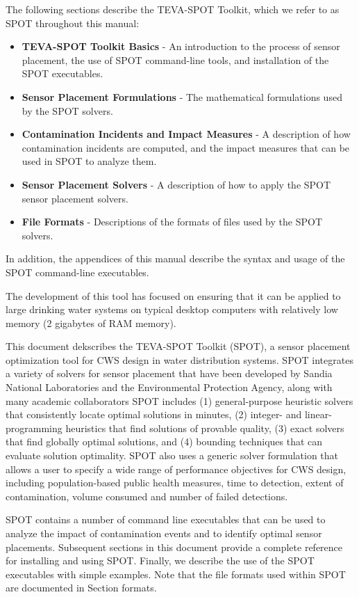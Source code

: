 The following sections describe the TEVA-\/SPOT Toolkit, which we refer to as SPOT throughout this manual: 
\begin{itemize}
\item {\bfseries TEVA-\/SPOT Toolkit Basics} -\/ An introduction to the process of sensor placement, the use of SPOT command-\/line tools, and installation of the SPOT executables. 
\item {\bfseries Sensor Placement Formulations} -\/ The mathematical formulations used by the SPOT solvers. 
\item {\bfseries Contamination Incidents and Impact Measures} -\/ A description of how contamination incidents are computed, and the impact measures that can be used in SPOT to analyze them.


\item {\bfseries Sensor Placement Solvers} -\/ A description of how to apply the SPOT sensor placement solvers. 
\item {\bfseries File Formats} -\/ Descriptions of the formats of files used by the SPOT solvers. 
\end{itemize}In addition, the appendices of this manual describe the syntax and usage of the SPOT command-\/line executables.

 

The development of this tool has focused on
ensuring that it can be applied to large drinking water systems on typical
desktop computers with relatively low memory (2 gigabytes of RAM memory).


This document dekscribes the TEVA-SPOT Toolkit (SPOT), a sensor placement
optimization tool for CWS design in water distribution systems. SPOT
integrates a variety of solvers for sensor placement that have been
developed by Sandia National Laboratories and the Environmental
Protection Agency, along with many academic collaborators\latexonly
\cite{MurUbeJan06,MurBerHar06,CarGreHarKonLauLinMorPhi06,HarBerMurPhiRieWat07,BerHarPhiUbeWat06,BerFleHarPhiWat05}
SPOT includes (1) general-purpose heuristic solvers that consistently
locate optimal solutions in minutes, (2) integer- and linear-programming
heuristics that find solutions of provable quality, (3) exact solvers
that find globally optimal solutions, and (4) bounding techniques that can
evaluate solution optimality. SPOT also uses a generic solver formulation
that allows a user to specify a wide range of performance objectives
for CWS design, including population-based public health measures,
time to detection, extent of contamination, volume consumed and number
of failed detections.

SPOT contains a number of command line executables that can be used to
analyze the impact of contamination events and to identify optimal sensor
placements. Subsequent sections in this document provide a complete
reference for installing and using SPOT. Finally, we describe the use
of the SPOT executables with simple examples.  Note that the file
formats used within SPOT are documented
in Section formats.

\fi
 
